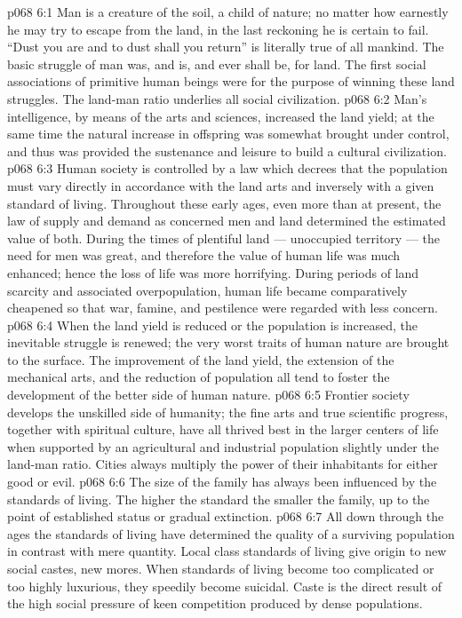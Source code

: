 \vs p068 6:1 Man is a creature of the soil, a child of nature; no matter how earnestly he may try to escape from the land, in the last reckoning he is certain to fail. “Dust you are and to dust shall you return” is literally true of all mankind. The basic struggle of man was, and is, and ever shall be, for land. The first social associations of primitive human beings were for the purpose of winning these land struggles. The land\hyp{}man ratio underlies all social civilization.
\vs p068 6:2 Man’s intelligence, by means of the arts and sciences, increased the land yield; at the same time the natural increase in offspring was somewhat brought under control, and thus was provided the sustenance and leisure to build a cultural civilization.
\vs p068 6:3 \pc Human society is controlled by a law which decrees that the population must vary directly in accordance with the land arts and inversely with a given standard of living. Throughout these early ages, even more than at present, the law of supply and demand as concerned men and land determined the estimated value of both. During the times of plentiful land --- unoccupied territory --- the need for men was great, and therefore the value of human life was much enhanced; hence the loss of life was more horrifying. During periods of land scarcity and associated overpopulation, human life became comparatively cheapened so that war, famine, and pestilence were regarded with less concern.
\vs p068 6:4 When the land yield is reduced or the population is increased, the inevitable struggle is renewed; the very worst traits of human nature are brought to the surface. The improvement of the land yield, the extension of the mechanical arts, and the reduction of population all tend to foster the development of the better side of human nature.
\vs p068 6:5 \pc Frontier society develops the unskilled side of humanity; the fine arts and true scientific progress, together with spiritual culture, have all thrived best in the larger centers of life when supported by an agricultural and industrial population slightly under the land\hyp{}man ratio. Cities always multiply the power of their inhabitants for either good or evil.
\vs p068 6:6 The size of the family has always been influenced by the standards of living. The higher the standard the smaller the family, up to the point of established status or gradual extinction.
\vs p068 6:7 All down through the ages the standards of living have determined the quality of a surviving population in contrast with mere quantity. Local class standards of living give origin to new social castes, new mores. When standards of living become too complicated or too highly luxurious, they speedily become suicidal. Caste is the direct result of the high social pressure of keen competition produced by dense populations.
